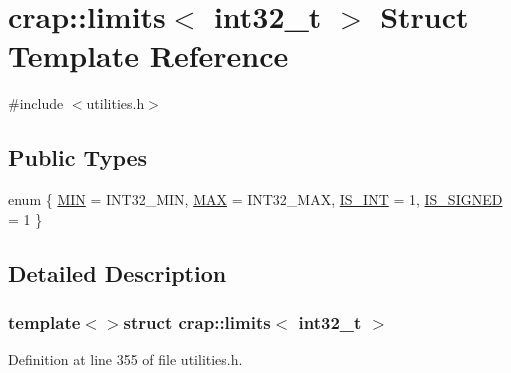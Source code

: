 \hypertarget{structcrap_1_1limits_3_01int32__t_01_4}{\section{crap\+:\+:limits$<$ int32\+\_\+t $>$ Struct Template Reference}
\label{structcrap_1_1limits_3_01int32__t_01_4}
}


{\ttfamily \#include $<$utilities.\+h$>$}

\subsection*{Public Types}
\begin{DoxyCompactItemize}
\item 
enum \{ \hyperlink{structcrap_1_1limits_3_01int32__t_01_4_af229389426c3fc5a762e00bcf793e7a1a38dc1df75abcbe660a6b95482164241a}{M\+I\+N} = I\+N\+T32\+\_\+\+M\+I\+N, 
\hyperlink{structcrap_1_1limits_3_01int32__t_01_4_af229389426c3fc5a762e00bcf793e7a1a0cadb85e49c844a9793962df51e64147}{M\+A\+X} = I\+N\+T32\+\_\+\+M\+A\+X, 
\hyperlink{structcrap_1_1limits_3_01int32__t_01_4_af229389426c3fc5a762e00bcf793e7a1adfcf8fb95d67edb7b835681a18ce0949}{I\+S\+\_\+\+I\+N\+T} = 1, 
\hyperlink{structcrap_1_1limits_3_01int32__t_01_4_af229389426c3fc5a762e00bcf793e7a1a181802a9b60de9f8d0bd62f5b02124bd}{I\+S\+\_\+\+S\+I\+G\+N\+E\+D} = 1
 \}
\end{DoxyCompactItemize}


\subsection{Detailed Description}
\subsubsection*{template$<$$>$struct crap\+::limits$<$ int32\+\_\+t $>$}



Definition at line 355 of file utilities.\+h.



